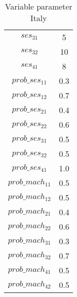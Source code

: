 \begin{table}[h!]
\begin{tabular}{|c|c|}
			 $ses_{31}$ & 5\\
			 $ses_{32}$ & 10\\
			 $ses_{41}$ & 8\\
			 \hline
			 $prob\_ses_{11}$ & 0.3\\
			 $prob\_ses_{12}$ & 0.7\\
			 $prob\_ses_{21}$ & 0.4\\
			 $prob\_ses_{22}$ & 0.6\\
			 $prob\_ses_{31}$ & 0.5\\
			 $prob\_ses_{32}$ & 0.5\\
			 $prob\_ses_{41}$ & 1.0\\
			 \hline
			 $prob\_mach_{11}$ & 0.5\\
			 $prob\_mach_{12}$ & 0.5\\
			 $prob\_mach_{21}$ & 0.4\\
			 $prob\_mach_{22}$ & 0.6\\
			 $prob\_mach_{31}$ & 0.3\\
			 $prob\_mach_{32}$ & 0.7\\
			 $prob\_mach_{41}$ & 0.5\\
			 $prob\_mach_{42}$ & 0.5\\
			 \hline
\end{tabular}
\caption{Variable parameter Italy}\label{tbl:variable_param_it}
\end{table}